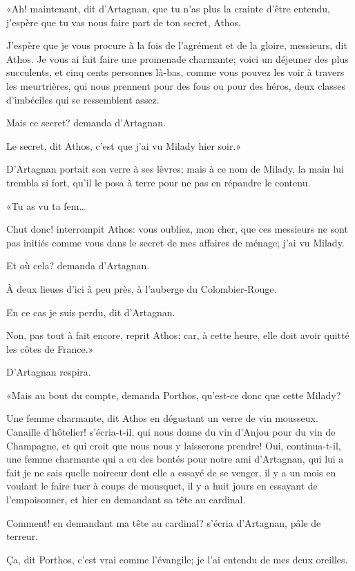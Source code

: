 «Ah! maintenant, dit d'Artagnan, que tu n'as plus la crainte d'être entendu, j'espère que tu vas nous faire part de ton secret, Athos. 

\speak  J'espère que je vous procure à la fois de l'agrément et de la gloire, messieurs, dit Athos. Je vous ai fait faire une promenade charmante; voici un déjeuner des plus succulents, et cinq cents personnes là-bas, comme vous pouvez les voir à travers les meurtrières, qui nous prennent pour des fous ou pour des héros, deux classes d'imbéciles qui se ressemblent assez. 

\speak  Mais ce secret? demanda d'Artagnan. 

\speak  Le secret, dit Athos, c'est que j'ai vu Milady hier soir.» 

D'Artagnan portait son verre à ses lèvres; mais à ce nom de Milady, la main lui trembla si fort, qu'il le posa à terre pour ne pas en répandre le contenu. 

«Tu as vu ta fem\dots 

\speak  Chut donc! interrompit Athos: vous oubliez, mon cher, que ces messieurs ne sont pas initiés comme vous dans le secret de mes affaires de ménage; j'ai vu Milady. 

\speak  Et où cela? demanda d'Artagnan. 

\speak  À deux lieues d'ici à peu près, à l'auberge du Colombier-Rouge. 

\speak  En ce cas je suis perdu, dit d'Artagnan. 

\speak  Non, pas tout à fait encore, reprit Athos; car, à cette heure, elle doit avoir quitté les côtes de France.» 

D'Artagnan respira. 

«Mais au bout du compte, demanda Porthos, qu'est-ce donc que cette Milady? 

\speak  Une femme charmante, dit Athos en dégustant un verre de vin mousseux. Canaille d'hôtelier! s'écria-t-il, qui nous donne du vin d'Anjou pour du vin de Champagne, et qui croit que nous nous y laisserons prendre! Oui, continua-t-il, une femme charmante qui a eu des bontés pour notre ami d'Artagnan, qui lui a fait je ne sais quelle noirceur dont elle a essayé de se venger, il y a un mois en voulant le faire tuer à coups de mousquet, il y a huit jours en essayant de l'empoisonner, et hier en demandant sa tête au cardinal. 

\speak  Comment! en demandant ma tête au cardinal? s'écria d'Artagnan, pâle de terreur. 

\speak  Ça, dit Porthos, c'est vrai comme l'évangile; je l'ai entendu de mes deux oreilles. 

